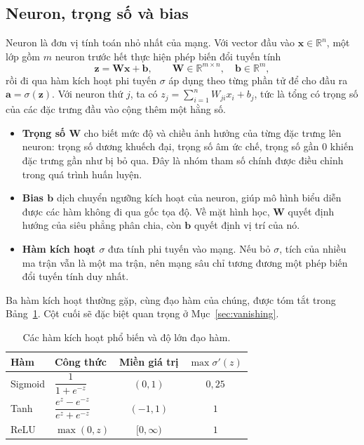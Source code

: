 \documentclass[12pt]{article}
\begin{document}
\subsection{Neuron, trọng số và bias}
Neuron là đơn vị tính toán nhỏ nhất của mạng. Với vector đầu vào $\mathbf{x}\in\mathbb{R}^{n}$, một lớp gồm $m$ neuron trước hết thực hiện phép biến đổi tuyến tính
\begin{equation}
    \mathbf{z}=\mathbf{W}\mathbf{x}+\mathbf{b},
    \qquad \mathbf{W}\in\mathbb{R}^{m\times n},\quad \mathbf{b}\in\mathbb{R}^{m},
    \label{eq:linear}
\end{equation}
rồi đi qua hàm kích hoạt phi tuyến $\sigma$ áp dụng theo từng phần tử để cho đầu ra $\mathbf{a}=\sigma(\mathbf{z})$. Với neuron thứ $j$, ta có $z_j=\sum_{i=1}^{n}W_{ji}x_i+b_j$, tức là tổng có trọng số của các đặc trưng đầu vào cộng thêm một hằng số.

\begin{itemize}
    \item \textbf{Trọng số $\mathbf{W}$} cho biết mức độ và chiều ảnh hưởng của từng đặc trưng lên neuron: trọng số dương khuếch đại, trọng số âm ức chế, trọng số gần $0$ khiến đặc trưng gần như bị bỏ qua. Đây là nhóm tham số chính được điều chỉnh trong quá trình huấn luyện.
    \item \textbf{Bias $\mathbf{b}$} dịch chuyển ngưỡng kích hoạt của neuron, giúp mô hình biểu diễn được các hàm không đi qua gốc tọa độ. Về mặt hình học, $\mathbf{W}$ quyết định hướng của siêu phẳng phân chia, còn $\mathbf{b}$ quyết định vị trí của nó.
    \item \textbf{Hàm kích hoạt $\sigma$} đưa tính phi tuyến vào mạng. Nếu bỏ $\sigma$, tích của nhiều ma trận vẫn là một ma trận, nên mạng sâu chỉ tương đương một phép biến đổi tuyến tính duy nhất.
\end{itemize}

Ba hàm kích hoạt thường gặp, cùng đạo hàm của chúng, được tóm tắt trong Bảng~\ref{tab:activation}. Cột cuối sẽ đặc biệt quan trọng ở Mục~\ref{sec:vanishing}.

\begin{table}[htbp]
    \centering
    \caption{Các hàm kích hoạt phổ biến và độ lớn đạo hàm.}
    \label{tab:activation}
    \begin{tabular}{@{}llcc@{}}
        \toprule
        Hàm & Công thức & Miền giá trị & $\max\sigma'(z)$ \\
        \midrule
        Sigmoid & $\dfrac{1}{1+e^{-z}}$ & $(0,1)$ & $0{,}25$ \\[6pt]
        Tanh & $\dfrac{e^{z}-e^{-z}}{e^{z}+e^{-z}}$ & $(-1,1)$ & $1$ \\[6pt]
        ReLU & $\max(0,z)$ & $[0,\infty)$ & $1$ \\
        \bottomrule
    \end{tabular}
\end{table}
\end{document}
